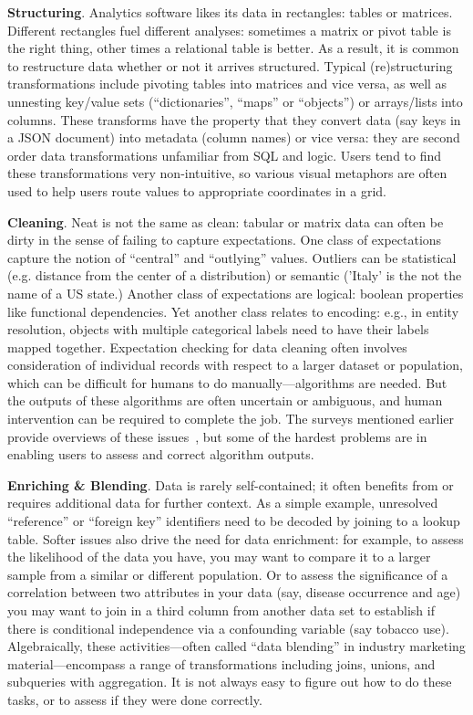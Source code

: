 \documentclass[11pt]{article}
\newcommand{\smallitem}[1]{\vspace{0.3em}\noindent\textbf{#1}}
\begin{document}
\smallitem{Structuring}. Analytics software likes its data in rectangles: tables or matrices. Different rectangles fuel different analyses: sometimes a matrix or pivot table is the right thing, other times a relational table is better.  As a result, it is common to restructure data whether or not it arrives structured. Typical (re)structuring transformations include pivoting tables into matrices and vice versa, as well as unnesting key/value sets (``dictionaries'', ``maps'' or ``objects'') or arrays/lists into columns. These transforms have the property that they convert data (say keys in a JSON document) into metadata (column names) or vice versa: they are second order data transformations unfamiliar from SQL and logic. Users tend to find these transformations very non-intuitive, so various visual metaphors are often used to help users route values to appropriate coordinates in a grid.

\smallitem{Cleaning}. Neat is not the same as clean: tabular or matrix data can often be dirty in the sense of failing to capture expectations. One class of expectations capture the notion of ``central'' and ``outlying'' values. Outliers can be statistical (e.g. distance from the center of a distribution) or semantic ('Italy' is the not the name of a US state.) Another class of expectations are logical: boolean properties like functional dependencies. Yet another class relates to encoding: e.g., in entity resolution, objects with multiple categorical labels need to have their labels mapped together. Expectation checking for data cleaning often involves consideration of individual records with respect to a larger dataset or population, which can be difficult for humans to do manually---algorithms are needed. But the outputs of these algorithms are often uncertain or ambiguous, and human intervention can be required to complete the job. The surveys mentioned earlier provide overviews of these issues~\cite{ilyas2015trends,doan2012principles,chu2016data,marcus2015crowdsourced}, but some of the hardest problems are in enabling users to assess and correct algorithm outputs.

\smallitem{Enriching \& Blending}. Data is rarely self-contained; it often benefits from or requires additional data for further context. As a simple example, unresolved ``reference'' or ``foreign key'' identifiers need to be decoded by joining to a lookup table. Softer issues also drive the need for data enrichment: for example, to assess the likelihood of the data you have, you may want to compare it to a larger sample from a similar or different population. Or to assess the significance of a correlation between two attributes in your data (say, disease occurrence and age) you may want to join in a third column from another data set to establish if there is conditional independence via a confounding variable (say tobacco use). Algebraically, these activities---often called ``data blending'' in industry marketing material---encompass a range of transformations including joins, unions, and subqueries with aggregation. It is not always easy to figure out how to do these tasks, or to assess if they were done correctly.
\end{document}
